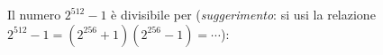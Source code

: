 Il numero $2^{512} - 1$ è divisibile per
(\emph{suggerimento}: si usi la relazione $2^{512} - 1 = (2^{256} + 1) (2^{256} - 1) = \cdots$):
